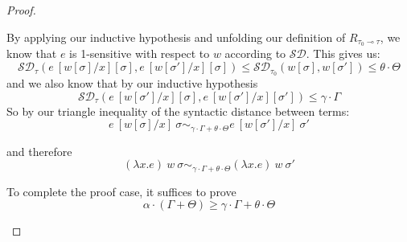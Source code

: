 \begin{proof}
\begin{description}
      By applying our inductive hypothesis and unfolding our definition of
      $R_{\tau_0 \multimap \tau}$, we know that $e$ is 
      1-sensitive with respect to $w$ according to $\mathcal{SD}$. 
      This gives us:
      $$
      \mathcal{SD}_{\tau}(e~[w[\sigma]/x][\sigma], e~[w[\sigma']/x][\sigma]) 
      \leq 
      \mathcal{SD}_{\tau_0}(w[\sigma], w[\sigma']) 
      \leq 
      \theta \cdot \Theta
      $$
      and we also know that by our inductive hypothesis
      $$
      \mathcal{SD}_{\tau}(e~[w[\sigma']/x][\sigma], e~[w[\sigma']/x][\sigma']) 
      \leq 
      \gamma \cdot \Gamma
      $$
      So by our triangle inequality of the syntactic distance between terms:
      $$
      e~[w[\sigma]/x]~\sigma \sim_{\gamma \cdot \Gamma + \theta \cdot \Theta}
      e~[w[\sigma']/x]~\sigma'
      $$

      and therefore
      $$
      (\lambda x . e)~w~\sigma \sim_{\gamma \cdot \Gamma + \theta \cdot \Theta} (\lambda x . e)~w~\sigma'
      $$

      To complete the proof case, it suffices to prove 
      $$\alpha \cdot (\Gamma + \Theta) \geq \gamma \cdot \Gamma + \theta \cdot \Theta$$


\end{description}
\end{proof}
